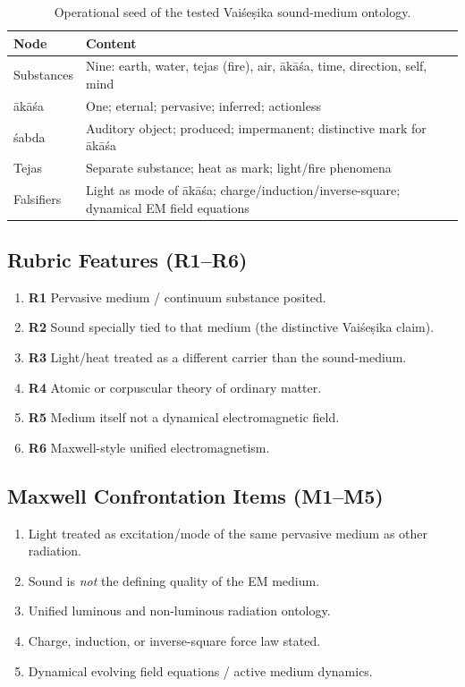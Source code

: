 \documentclass[12pt]{article}
\newcommand{\Vais}{Vaiśeṣika}
\newcommand{\akasa}{ākāśa}
\newcommand{\sabda}{śabda}
\begin{document}
\begin{table}[H]
\centering
\caption{Operational seed of the tested \Vais{} sound-medium ontology.}
\label{tab:seed}
\begin{tabular}{@{}p{2.5cm}p{10.8cm}@{}}
\toprule
\textbf{Node} & \textbf{Content} \\
\midrule
Substances & Nine: earth, water, tejas (fire), air, \akasa, time, direction, self, mind \\
\akasa & One; eternal; pervasive; inferred; actionless \\
\sabda & Auditory object; produced; impermanent; distinctive mark for \akasa \\
Tejas & Separate substance; heat as mark; light/fire phenomena \\
Falsifiers & Light as mode of \akasa; charge/induction/inverse-square; dynamical EM field equations \\
\bottomrule
\end{tabular}
\end{table}

\subsection{Rubric Features (R1--R6)}
\begin{enumerate}
\item \textbf{R1} Pervasive medium / continuum substance posited.
\item \textbf{R2} Sound specially tied to that medium (the distinctive \Vais{} claim).
\item \textbf{R3} Light/heat treated as a different carrier than the sound-medium.
\item \textbf{R4} Atomic or corpuscular theory of ordinary matter.
\item \textbf{R5} Medium itself not a dynamical electromagnetic field.
\item \textbf{R6} Maxwell-style unified electromagnetism.
\end{enumerate}

\subsection{Maxwell Confrontation Items (M1--M5)}
\begin{enumerate}
\item Light treated as excitation/mode of the same pervasive medium as other radiation.
\item Sound is \emph{not} the defining quality of the EM medium.
\item Unified luminous and non-luminous radiation ontology.
\item Charge, induction, or inverse-square force law stated.
\item Dynamical evolving field equations / active medium dynamics.
\end{enumerate}
\end{document}
